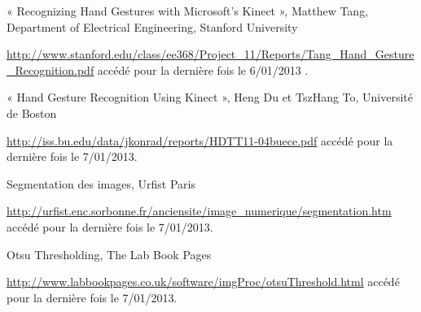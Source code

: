 \begin{thebibliography}{9}


« Recognizing Hand Gestures with Microsoft's Kinect », Matthew Tang, Department of Electrical Engineering, Stanford University

\url{http://www.stanford.edu/class/ee368/Project_11/Reports/Tang_Hand_Gesture_Recognition.pdf} accédé pour la dernière fois le 6/01/2013 .


« Hand Gesture Recognition Using Kinect », Heng Du et TszHang To, Université de Boston

\url{http://iss.bu.edu/data/jkonrad/reports/HDTT11-04buece.pdf} accédé pour la dernière fois le 7/01/2013.


Segmentation des images, Urfist Paris

\url{http://urfist.enc.sorbonne.fr/anciensite/image_numerique/segmentation.htm} accédé pour la dernière fois le 7/01/2013.


Otsu Thresholding, The Lab Book Pages

\url{http://www.labbookpages.co.uk/software/imgProc/otsuThreshold.html} accédé pour la dernière fois le 7/01/2013.

\end{thebibliography}